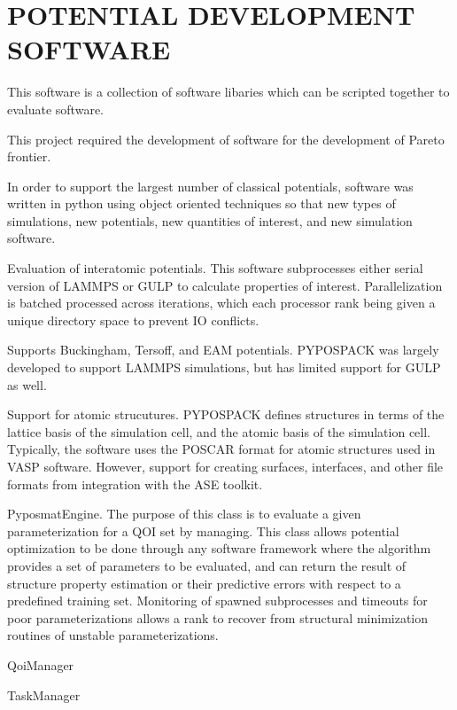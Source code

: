 \chapter{POTENTIAL DEVELOPMENT SOFTWARE}

This software is a collection of software libaries which can be scripted together to evaluate software.

This project required the development of software for the development of Pareto frontier.

In order to support the largest number of classical potentials, software was written in python using object oriented techniques so that new types of simulations, new potentials, new quantities of interest, and new simulation software.

Evaluation of interatomic potentials.  This software subprocesses either serial version of LAMMPS or GULP to calculate properties of interest.  Parallelization is batched processed across iterations, which each processor rank being given a unique directory space to prevent IO conflicts.

Supports Buckingham, Tersoff, and EAM potentials.  PYPOSPACK was largely developed to support LAMMPS simulations, but has limited support for GULP as well.

Support for atomic strucutures.  PYPOSPACK defines structures in terms of the lattice basis of the simulation cell, and the atomic basis of the simulation cell.  Typically, the software uses the POSCAR format for atomic structures used in VASP software.  However, support for creating surfaces, interfaces, and other file formats from integration with the ASE toolkit.

PyposmatEngine.  The purpose of this class is to evaluate a given parameterization for a QOI set by managing.  This class allows potential optimization to be done through any software framework where the algorithm provides a set of parameters to be evaluated, and can return the result of structure property estimation or their predictive errors with respect to a predefined training set.  Monitoring of spawned subprocesses and timeouts for poor parameterizations allows a rank to recover from structural minimization routines of unstable parameterizations.

QoiManager

TaskManager
